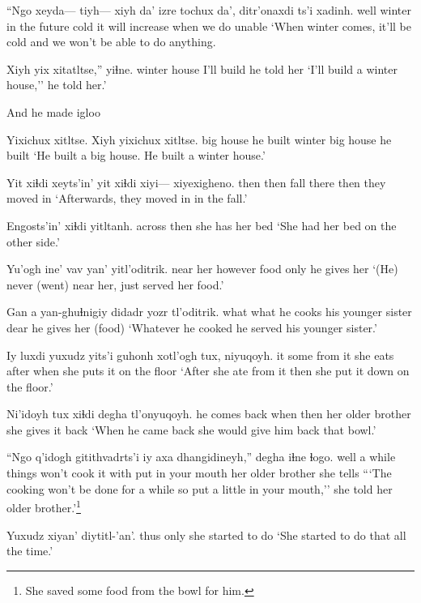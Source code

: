 \documentclass[12pt]{article}
\begin{document}
\gll ``Ngo xeyda--- tiyh--- xiyh da'      izre tochux da', ditr'onaxdi ts'i xadinh.
well {} {} winter {in the future}  cold {it will increase} when {we do} {} unable
\glt `When winter comes, it'll be cold and we won't be able to do anything.
\glend

\gll Xiyh yix xitatltse,'' yiɬne.
winter house {I'll build} {he told her}
\glt `I'll build a winter house,'' he told her.'
\glend

And he made igloo 

\gll Yixichux  xitltse. Xiyh yixichux xitltse.
{big house} {he built} winter {big house}  {he built}
\glt `He built a big house. He built a winter house.'
\glend

\gll Yit xiɬdi xeyts'in' yit xiɬdi xiyi--- xiyexigheno.
then  then fall  there then {}  {they moved in}
\glt `Afterwards, they moved in in the fall.'
\glend

\gll Engosts'in' xiɬdi yitltanh.
across      then  {she has her bed}
\glt `She had her bed on the other side.'
\glend

\gll Yu'ogh   ine' vav  yan' yitl'oditrik.
{near her} however  food only {he gives her}
\glt `(He) never (went) near her, just served her food.'
\glend

\gll Gan a {yan-ghuɬnigiy}  didadr             yozr tl'oditrik.
what {}  {what he cooks} {his younger sister} dear {he gives her (food)}
\glt `Whatever he cooked he served his younger sister.'
\glend

\gll Iy luxdi yuxudz yits'i guhonh   xotl'ogh tux, niyuqoyh.
it some {}      {from it} {she eats} after when {she puts it on the floor}
\glt `After she ate from it then she put it down on the floor.'
\glend

\gll Ni'idoyh      tux  xiɬdi degha             tl'onyuqoyh.
{he comes back} when then  {her older brother} {she gives it back}
\glt `When he came back she would give him back that bowl.'
\glend

\gll ``Ngo q'idogh {gitithvadrts'i}      iy axa  dhangidineyh,''      degha             {iɬne }     ɬogo.
well  {a while} {things won't cook} it with {put in your mouth} {her older brother} {she tells} 
\glt ```The cooking won't be done for a while so put a little in your mouth,'' she told her older brother.'\footnote{She saved some food from the bowl for him.}
\glend

\gll Yuxudz    xiyan' diytitl-'an'.
thus     only   {she started to do}
\glt `She started to do that all the time.'
\glend
\end{document}

